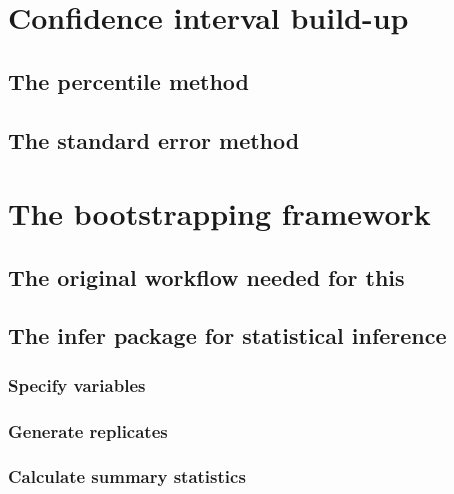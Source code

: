 \documentclass[12pt, krantz2,]{krantz}
\begin{document}
\hypertarget{ci-build-up}{%
\section{Confidence interval build-up}\label{ci-build-up}}

\hypertarget{percentile-method}{%
\subsection{The percentile method}\label{percentile-method}}

\hypertarget{the-standard-error-method}{%
\subsection{The standard error method}\label{the-standard-error-method}}

\hypertarget{bootstrap-process}{%
\section{The bootstrapping framework}\label{bootstrap-process}}

\hypertarget{the-original-workflow-needed-for-this}{%
\subsection{The original workflow needed for this}\label{the-original-workflow-needed-for-this}}

\hypertarget{the-infer-package-for-statistical-inference}{%
\subsection{The infer package for statistical inference}\label{the-infer-package-for-statistical-inference}}

\hypertarget{specify-variables}{%
\subsubsection*{Specify variables}\label{specify-variables}}


\hypertarget{generate-replicates}{%
\subsubsection*{Generate replicates}\label{generate-replicates}}


\hypertarget{calculate-summary-statistics}{%
\subsubsection*{Calculate summary statistics}\label{calculate-summary-statistics}}
\end{document}
